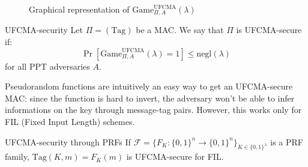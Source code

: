 \documentclass[a4paper, 12pt]{report}
\begin{document}
    \begin{figure}[H]
        \centering


        \caption{Graphical representation of $\mathrm{Game}^{\text{UFCMA}}_{\Pi, A}(\lambda)$}
    \end{figure}

    \begin{frameddefn}{UFCMA-security}
        Let $\Pi = (\mathrm{Tag})$ be a MAC. We say that $\Pi$ is UFCMA-secure if:
        \[\Pr[\mathrm{Game}^{\text{UFCMA}}_{\Pi, A}(\lambda) = 1] \leq \mathrm{negl}(\lambda)\]
        for all PPT adversaries $A$.
    \end{frameddefn}

    Pseudorandom functions are intuitively an easy way to get an UFCMA-secure MAC: since the function is hard to invert, the adversary won't be able to infer informations on the key through message-tag pairs. However, this works only for FIL (Fixed Input Length) schemes.
    
    \begin{framedthm}[label={ufcma_prf}]{UFCMA-security through PRFs}
        If $\mathcal{F} = \{F_K : \{0,1\}^n \to \{0,1\}^n\}_{K \in \{0,1\}^\lambda}$ is a PRF family, $\mathrm{Tag}(K, m) = F_K(m)$ is UFCMA-secure for FIL.
    \end{framedthm}
\end{document}
